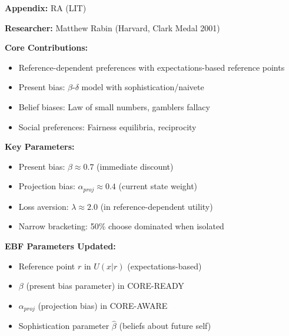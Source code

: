 \begin{tcolorbox}[colback=gray!5!white,colframe=gray!75!black,title=Quick Reference]
\textbf{Appendix:} RA (LIT)

\textbf{Researcher:} Matthew Rabin (Harvard, Clark Medal 2001)

\textbf{Core Contributions:}
\begin{itemize}
    \item Reference-dependent preferences with expectations-based reference points
    \item Present bias: $\beta$-$\delta$ model with sophistication/naivete
    \item Belief biases: Law of small numbers, gamblers fallacy
    \item Social preferences: Fairness equilibria, reciprocity
\end{itemize}

\textbf{Key Parameters:}
\begin{itemize}
    \item Present bias: $\beta \approx 0.7$ (immediate discount)
    \item Projection bias: $\alpha_{proj} \approx 0.4$ (current state weight)
    \item Loss aversion: $\lambda \approx 2.0$ (in reference-dependent utility)
    \item Narrow bracketing: 50\% choose dominated when isolated
\end{itemize}

\textbf{EBF Parameters Updated:}
\begin{itemize}
    \item Reference point $r$ in $U(x|r)$ (expectations-based)
    \item $\beta$ (present bias parameter) in CORE-READY
    \item $\alpha_{proj}$ (projection bias) in CORE-AWARE
    \item Sophistication parameter $\hat{\beta}$ (beliefs about future self)
\end{itemize}
\end{tcolorbox}


